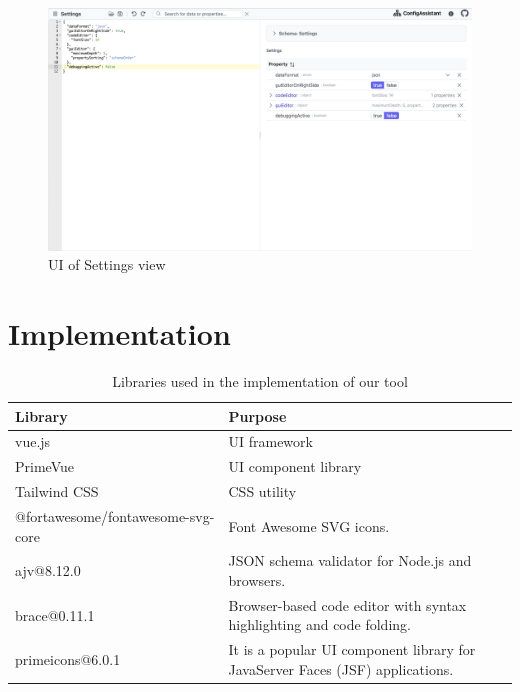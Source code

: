 \begin{figure}[!htb]
    \includegraphics[width=\textwidth]{figures/settings}
    \caption{UI of Settings view}
    \label{fig:settings}
\end{figure}



\section{Implementation}\label{sec:appendix-implementation}
\begin{table}[!htb] %
    \caption{Libraries used in the implementation of our tool} %
    \label{tab:libraries}
    \centering
    \begin{tabular}{ll}
        \toprule
        \textbf{Library} & \textbf{Purpose}     \\
        \midrule
        vue.js           & UI framework         \\
        PrimeVue         & UI component library \\
        Tailwind CSS     & CSS utility          \\
        @fortawesome/fontawesome-svg-core & Font Awesome SVG icons. \\
        ajv@8.12.0 & JSON schema validator for Node.js and browsers. \\
        brace@0.11.1 & Browser-based code editor with syntax highlighting and code folding. \\
        primeicons@6.0.1 & It is a popular UI component library for JavaServer Faces (JSF) applications. \\
        \bottomrule
    \end{tabular}
\end{table}


